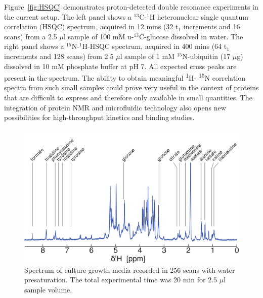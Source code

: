 \documentclass[preprint,12pt]{article}
\begin{document}
Figure~\ref{fig:HSQC} demonstrates proton-detected double resonance experiments in the current setup. 
The left panel shows a $^{13}$C-$^{1}$H heteronuclear single quantum correlation (HSQC) spectrum, acquired in 12 mins 
(32 t$_1$ increments and 16 scans) 
from a 2.5 $\mu$l sample of 100 mM u-$^{13}$C-glucose dissolved in water. The right panel shows a 
$^{15}$N-$^{1}$H-HSQC spectrum, acquired in 400 mins (64 t$_1$ increments and 128 scans) 
from 2.5 $\mu$l sample of 1 mM $^{15}$N-ubiquitin (17 $\mu$g) dissolved in 10 mM phosphate buffer at pH 7. 
All expected cross peaks are present in the spectrum. The ability to obtain meaningful  \textsuperscript{1}H-
\textsuperscript{15}N correlation spectra from such small samples could prove very useful in the context of
proteins that are difficult to express and therefore only available in small quantities. The integration of
protein NMR and microfluidic technology also opens new possibilities for high-throughput kinetics and 
binding studies. 

\begin{figure}
\centering
\includegraphics[width=.7\linewidth,keepaspectratio=true]{./figures/media-180125-005-bigger-font.png} 
\caption{Spectrum of culture growth media recorded in 256 scans with water presaturation. The total experimental time was 20 min for 2.5 $\mu$l sample volume.}
\label{fig:media-spec} 
\end{figure}
\end{document}
